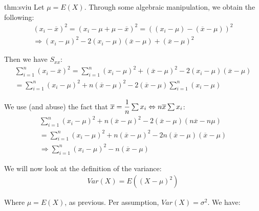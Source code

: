 \begin{prf}{thm:sviu}
  Let $\mu = E(X)$. Through some algebraic manipulation, we obtain the following:
  \begin{equation*}
    \begin{gathered}
      (x_i-\overline{x})^2 = (x_i-\mu+\mu-\overline{x})^2 = ((x_i-\mu)-(\overline{x}-\mu))^2\\
      \Rightarrow (x_i-\mu)^2-2(x_i-\mu)(\overline{x}-\mu)+(\overline{x}-\mu)^2
    \end{gathered}
  \end{equation*}
  \par\bigskip
  \noindent Then we have $S_{xx}$:
  \begin{equation*}
    \begin{gathered}
      \sum_{i=1}^{n}(x_i-\overline{x})^2 = \sum_{i=1}^{n}(x_i-\mu)^2+(\overline{x}-\mu)^2 -2(x_i-\mu)(\overline{x}-\mu)\\
      = \sum_{i=1}^{n}(x_i-\mu)^2+n(\overline{x}-\mu)^2 -2(\overline{x}-\mu)\sum_{i=1}^{n}(x_i-\mu)
    \end{gathered}
  \end{equation*}
  \par\bigskip
  \noindent We use (and abuse) the fact that $\overline{x} = \dfrac{1}{n}\sum x_i\Leftrightarrow n\overline{x}\sum x_i$:
  \begin{equation*}
    \begin{gathered}
      \sum_{i=1}^{n}(x_i-\mu)^2+n(\overline{x}-\mu)^2-2(\overline{x}-\mu)(n\overline{x}-n\mu)\\
      = \sum_{i=1}^{n}(x_i-\mu)^2 + n(\overline{x}-\mu)^2-2n(\overline{x}-\mu)(\overline{x}-\mu)\\
      \Rightarrow \sum_{i=1}^{n}(x_i-\mu)^2-n(\overline{x}-\mu)
    \end{gathered}
  \end{equation*}
  \par\bigskip
  \noindent We will now look at the definition of the variance:
  \begin{equation*}
    \begin{gathered}
      Var(X) = E((X-\mu)^2)
    \end{gathered}
  \end{equation*}
  \par\bigskip
  \noindent Where $\mu = E(X)$, as previous. Per assumption, $Var(X) = \sigma^2$. We have:
  \begin{equation*}
    \begin{gathered}

\end{gathered}
\end{equation*}
\end{prf}
